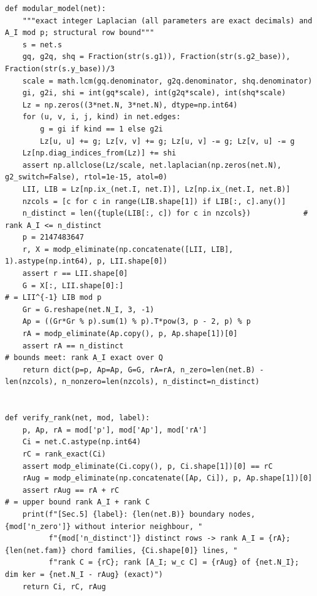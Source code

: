 \documentclass[11pt,a4paper]{article}
\theoremstyle{definition}
\theoremstyle{remark}
\begin{document}
\begin{lstlisting}
def modular_model(net):
    """exact integer Laplacian (all parameters are exact decimals) and A_I mod p; structural row bound"""
    s = net.s
    gq, g2q, shq = Fraction(str(s.g1)), Fraction(str(s.g2_base)), Fraction(str(s.y_base))/3
    scale = math.lcm(gq.denominator, g2q.denominator, shq.denominator)
    gi, g2i, shi = int(gq*scale), int(g2q*scale), int(shq*scale)
    Lz = np.zeros((3*net.N, 3*net.N), dtype=np.int64)
    for (u, v, i, j, kind) in net.edges:
        g = gi if kind == 1 else g2i
        Lz[u, u] += g; Lz[v, v] += g; Lz[u, v] -= g; Lz[v, u] -= g
    Lz[np.diag_indices_from(Lz)] += shi
    assert np.allclose(Lz/scale, net.laplacian(np.zeros(net.N), g2_switch=False), rtol=1e-15, atol=0)
    LII, LIB = Lz[np.ix_(net.I, net.I)], Lz[np.ix_(net.I, net.B)]
    nzcols = [c for c in range(LIB.shape[1]) if LIB[:, c].any()]
    n_distinct = len({tuple(LIB[:, c]) for c in nzcols})            # rank A_I <= n_distinct
    p = 2147483647
    r, X = modp_eliminate(np.concatenate([LII, LIB], 1).astype(np.int64), p, LII.shape[0])
    assert r == LII.shape[0]
    G = X[:, LII.shape[0]:]                                           # = LII^{-1} LIB mod p
    Gr = G.reshape(net.N_I, 3, -1)
    Ap = ((Gr*Gr % p).sum(1) % p).T*pow(3, p - 2, p) % p
    rA = modp_eliminate(Ap.copy(), p, Ap.shape[1])[0]
    assert rA == n_distinct                                           # bounds meet: rank A_I exact over Q
    return dict(p=p, Ap=Ap, G=G, rA=rA, n_zero=len(net.B) - len(nzcols), n_nonzero=len(nzcols), n_distinct=n_distinct)


def verify_rank(net, mod, label):
    p, Ap, rA = mod['p'], mod['Ap'], mod['rA']
    Ci = net.C.astype(np.int64)
    rC = rank_exact(Ci)
    assert modp_eliminate(Ci.copy(), p, Ci.shape[1])[0] == rC
    rAug = modp_eliminate(np.concatenate([Ap, Ci]), p, Ap.shape[1])[0]
    assert rAug == rA + rC                                            # = upper bound rank A_I + rank C
    print(f"[Sec.5] {label}: {len(net.B)} boundary nodes, {mod['n_zero']} without interior neighbour, "
          f"{mod['n_distinct']} distinct rows -> rank A_I = {rA}; {len(net.fam)} chord families, {Ci.shape[0]} lines, "
          f"rank C = {rC}; rank [A_I; w_c C] = {rAug} of {net.N_I}; dim ker = {net.N_I - rAug} (exact)")
    return Ci, rC, rAug



\end{lstlisting}
\end{document}
